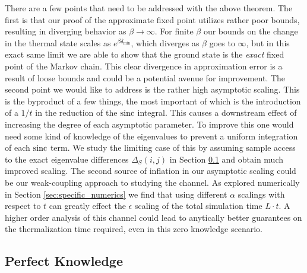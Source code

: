 There are a few points that need to be addressed with the above theorem. The first is that our proof of the approximate fixed point utilizes rather poor bounds, resulting in diverging behavior as $\beta \to \infty$. For finite $\beta$ our bounds on the change in the thermal state scales as $e^{\beta \delta_{\min}}$, which diverges as $\beta$ goes to $\infty$, but in this exact same limit we are able to show that the ground state is the \emph{exact} fixed point of the Markov chain. This clear divergence in approximation error is a result of loose bounds and could be a potential avenue for improvement. The second point we would like to address is the rather high asymptotic scaling. This is the byproduct of a few things, the most important of which is the introduction of a $1/t$ in the reduction of the $\operatorname{sinc}$ integral. This causes a downstream effect of increasing the degree of each asymptotic parameter. To improve this one would need some kind of knowledge of the eigenvalues to prevent a uniform integration of each $\operatorname{sinc}$ term. We study the limiting case of this by assuming sample access to the exact eigenvalue differences $\Delta_S(i,j)$ in Section \ref{sec:perfect_knowledge} and obtain much improved scaling. The second source of inflation in our asymptotic scaling could be our weak-coupling approach to studying the channel. As explored numerically in Section \ref{sec:specific_numerics} we find that using different $\alpha$ scalings with respect to $t$ can greatly effect the $\epsilon$ scaling of the total simulation time $L \cdot t$. A higher order analysis of this channel could lead to anytically better guarantees on the thermalization time required, even in this zero knowledge scenario.

\subsection{Perfect Knowledge} \label{sec:perfect_knowledge}

